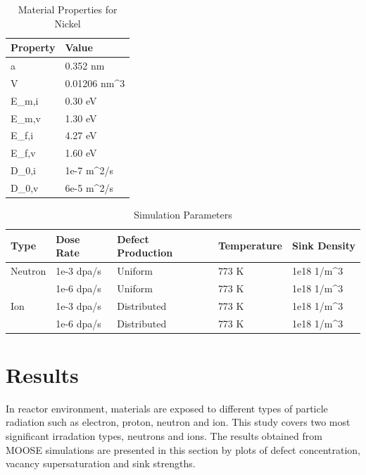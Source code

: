 \documentclass[a4paper]{article}
\begin{document}
\begin{table}[h!]
  \centering
  \caption{Material Properties for Nickel\cite{walgraef1996}}
  \label{table:Ni_material_properties}
  \begin{tabular}{ ||p{2cm}|p{2cm}||  }
     \hline
     Property & Value\\
     \hline\hline
     a  & 0.352 nm\\
     V  & 0.01206 nm^3\\
     E_{m,i}  & 0.30 eV\\
     E_{m,v}  & 1.30 eV\\
     E_{f,i}  & 4.27 eV\\
     E_{f,v}  & 1.60 eV\\
     D_{0,i}  & 1e-7 m^2/s\\
     D_{0,v}  & 6e-5 m^2/s\\

     \hline
  \end{tabular}
\end{table}

\begin{table}[h!]
  \centering
  \caption{Simulation Parameters}
  \label{table:simulation_parameters}
  \begin{tabular}{ ||p{2cm}|p{2cm}|p{3cm}|p{2cm}|p{2cm}||  }
     \hline
     Type & Dose Rate & Defect Production & Temperature & Sink Density\\
     \hline
     \hline
     Neutron  & 1e-3 dpa/s  & Uniform     & 773 K & 1e18 1/m^{3}\\
              & 1e-6 dpa/s  & Uniform     & 773 K & 1e18 1/m^{3}\\
     \hline
     Ion      & 1e-3 dpa/s  & Distributed & 773 K & 1e18 1/m^{3}\\
              & 1e-6 dpa/s  & Distributed & 773 K & 1e18 1/m^{3}\\
     \hline
  \end{tabular}
\end{table}

\newpage
\section{Results} \hspace{10pt}

In reactor environment, materials are exposed to different types of particle radiation such as electron, proton, neutron and ion. This study covers two most significant irradation types, neutrons and ions. The results obtained from MOOSE simulations are presented in this section by plots of defect concentration, vacancy supersaturation and sink strengths. %
\end{document}
